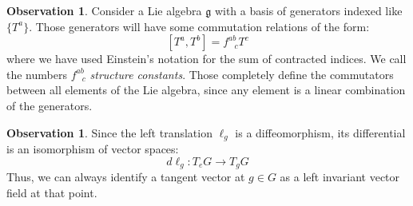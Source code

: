 \documentclass[12pt,a4paper]{report}
\theoremstyle{definition}
\theoremstyle{Theorem}
\theoremstyle{definition}
\theoremstyle{definition}
\newtheorem{Obs}[Def]{Observation}
\begin{document}
	\begin{Obs}
		Consider a Lie algebra $\mathfrak{g}$ with a basis of generators indexed like $\{T^a\}$. Those generators will have some commutation relations of the form:
		$$[T^a,T^b]=f^{ab}_{\hspace{9pt}c}T^c$$
		where we have used Einstein's notation for the sum of contracted indices. We call the numbers $f^{ab}_{\hspace{9pt}c}$ \textit{structure constants}. Those completely define the commutators between all elements of the Lie algebra, since any element is a linear combination of the generators.
	\end{Obs}
	\begin{Obs}
		Since the left translation $\ell_g$ is a diffeomorphism, its differential is an isomorphism of vector spaces:
		$$d\ell_g:T_eG\rightarrow T_gG$$
		Thus, we can always identify a tangent vector at $g\in G$ as a left invariant vector field at that point.
	\end{Obs}
\end{document}
